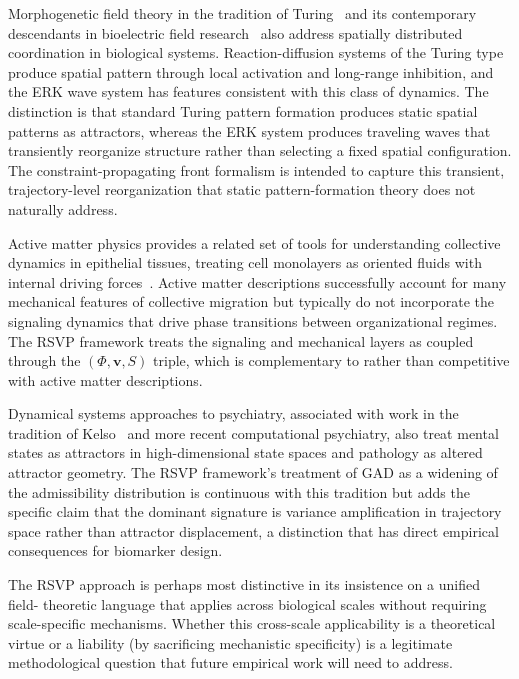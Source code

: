 \documentclass[11pt,a4paper]{article}
\theoremstyle{plain}
\theoremstyle{definition}
\begin{document}
Morphogenetic field theory in the tradition of Turing~\cite{Turing1952} and its
contemporary descendants in bioelectric field research~\cite{Levin2012} also address
spatially distributed coordination in biological systems. Reaction-diffusion systems of
the Turing type produce spatial pattern through local activation and long-range inhibition,
and the ERK wave system has features consistent with this class of dynamics. The
distinction is that standard Turing pattern formation produces static spatial patterns
as attractors, whereas the ERK system produces traveling waves that transiently reorganize
structure rather than selecting a fixed spatial configuration. The constraint-propagating
front formalism is intended to capture this transient, trajectory-level reorganization
that static pattern-formation theory does not naturally address.

Active matter physics provides a related set of tools for understanding collective
dynamics in epithelial tissues, treating cell monolayers as oriented fluids with
internal driving forces~\cite{Haken1983}. Active matter descriptions successfully account
for many mechanical features of collective migration but typically do not incorporate
the signaling dynamics that drive phase transitions between organizational regimes.
The RSVP framework treats the signaling and mechanical layers as coupled through the
$(\Phi, \mathbf{v}, S)$ triple, which is complementary to rather than competitive with
active matter descriptions.

Dynamical systems approaches to psychiatry, associated with work in the tradition of
Kelso~\cite{Kelso1995} and more recent computational psychiatry, also treat mental
states as attractors in high-dimensional state spaces and pathology as altered attractor
geometry. The RSVP framework's treatment of GAD as a widening of the admissibility
distribution is continuous with this tradition but adds the specific claim that the
dominant signature is variance amplification in trajectory space rather than attractor
displacement, a distinction that has direct empirical consequences for biomarker design.

The RSVP approach is perhaps most distinctive in its insistence on a unified field-
theoretic language that applies across biological scales without requiring scale-specific
mechanisms. Whether this cross-scale applicability is a theoretical virtue or a liability
(by sacrificing mechanistic specificity) is a legitimate methodological question that
future empirical work will need to address.
\end{document}
